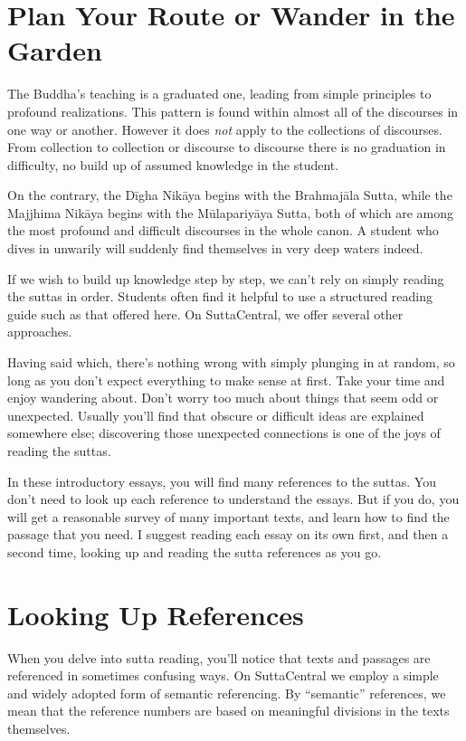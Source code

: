 \documentclass[12pt,openany]{book}%
\begin{document}
\section*{Plan Your Route or Wander in the Garden}

The Buddha’s teaching is a graduated one, leading from simple principles to profound realizations. This pattern is found within almost all of the discourses in one way or another. However it does \emph{not} apply to the collections of discourses. From collection to collection or discourse to discourse there is no graduation in difficulty, no build up of assumed knowledge in the student.

On the contrary, the \textsanskrit{Dīgha} \textsanskrit{Nikāya} begins with the \textsanskrit{Brahmajāla} Sutta, while the Majjhima \textsanskrit{Nikāya} begins with the \textsanskrit{Mūlapariyāya} Sutta, both of which are among the most profound and difficult discourses in the whole canon. A student who dives in unwarily will suddenly find themselves in very deep waters indeed.

If we wish to build up knowledge step by step, we can’t rely on simply reading the suttas in order. Students often find it helpful to use a structured reading guide such as that offered here. On SuttaCentral, we offer several other approaches.

Having said which, there’s nothing wrong with simply plunging in at random, so long as you don’t expect everything to make sense at first. Take your time and enjoy wandering about. Don’t worry too much about things that seem odd or unexpected. Usually you’ll find that obscure or difficult ideas are explained somewhere else; discovering those unexpected connections is one of the joys of reading the suttas.

In these introductory essays, you will find many references to the suttas. You don’t need to look up each reference to understand the essays. But if you do, you will get a reasonable survey of many important texts, and learn how to find the passage that you need. I suggest reading each essay on its own first, and then a second time, looking up and reading the sutta references as you go.

\section*{Looking Up References}

When you delve into sutta reading, you’ll notice that texts and passages are referenced in sometimes confusing ways. On SuttaCentral we employ a simple and widely adopted form of semantic referencing. By “semantic” references, we mean that the reference numbers are based on meaningful divisions in the texts themselves.
\end{document}
